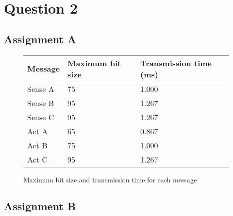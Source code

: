 \section{Question 2}
    \subsection{Assignment A}

    \renewcommand{\arraystretch}{1.4}
    \begin{figure}[H]
    \centering
    \begin{minipage}{0.5\textwidth}
        \begin{table}[H]
        \centering
        \begin{tabular}{|l|l|l|}
            \hline
            \rowcolor{green!40}\textbf{Message}     & \textbf{Maximum bit size}     & \textbf{Transmission time (ms)}  \\ \hline
            Sense A                                 & 75                            & 1.000     \\ \hline
            Sense B                                 & 95                            & 1.267     \\ \hline
            Sense C                                 & 95                            & 1.267     \\ \hline
            Act A                                   & 65                            & 0.867     \\ \hline
            Act B                                   & 75                            & 1.000     \\ \hline
            Act C                                   & 95                            & 1.267     \\ \hline
        \end{tabular}
        \end{table}
    \end{minipage}%
    \caption{Maximum bit size and transmission time for each message}
    \label{fig:maxbittrans}
    \end{figure}
    \renewcommand{\arraystretch}{1.0}

    \subsection{Assignment B}

